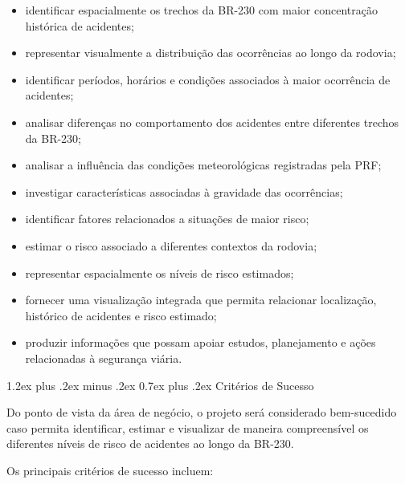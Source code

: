 \documentclass[11pt,a4paper]{article}
\makeatletter
\renewcommand\subsection{
\@startsection{subsection}{2}{0pt}%
{1.2ex plus .2ex minus .2ex}%
{0.7ex plus .2ex}%
{\normalfont\large\bfseries}
}
\makeatother
\begin{document}
\begin{itemize}

    \item identificar espacialmente os trechos da BR-230 com maior concentração histórica de acidentes;

    \item representar visualmente a distribuição das ocorrências ao longo da rodovia;

    \item identificar períodos, horários e condições associados à maior ocorrência de acidentes;

    \item analisar diferenças no comportamento dos acidentes entre diferentes trechos da BR-230;

    \item analisar a influência das condições meteorológicas registradas pela PRF;

    \item investigar características associadas à gravidade das ocorrências;

    \item identificar fatores relacionados a situações de maior risco;

    \item estimar o risco associado a diferentes contextos da rodovia;

    \item representar espacialmente os níveis de risco estimados;

    \item fornecer uma visualização integrada que permita relacionar localização, histórico de acidentes e risco estimado;

    \item produzir informações que possam apoiar estudos, planejamento e ações relacionadas à segurança viária.

\end{itemize}

\subsection{Critérios de Sucesso}

Do ponto de vista da área de negócio, o projeto será considerado bem-sucedido caso permita identificar, estimar e visualizar de maneira compreensível os diferentes níveis de risco de acidentes ao longo da BR-230.

Os principais critérios de sucesso incluem:
\end{document}
